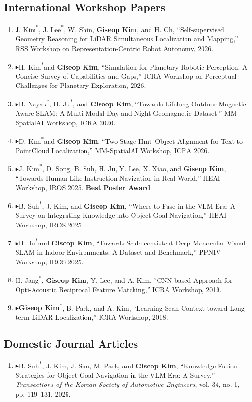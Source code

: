 \documentclass[10pt,a4paper]{article}
\newcommand{\pub}[1]{\item #1}
\newcommand{\leadpub}{\textbf{\ensuremath{\blacktriangleright}}\hspace{0.25em}}
\newcommand{\me}{\textbf{Giseop Kim}}
\newcommand{\corr}{\textsuperscript{\dag}}
\newcommand{\first}{\textsuperscript{*}}
\begin{document}
\subsection{International Workshop Papers}
\begin{enumerate}[resume]
\pub{J. Kim\first, J. Lee\first, W. Shin, \me, and H. Oh\corr, ``Self-supervised Geometry Reasoning for LiDAR Simultaneous Localization and Mapping,'' RSS Workshop on Representation-Centric Robot Autonomy, 2026.}
\pub{\leadpub H. Kim\first and \me\corr, ``Simulation for Planetary Robotic Perception: A Concise Survey of Capabilities and Gaps,'' ICRA Workshop on Perceptual Challenges for Planetary Exploration, 2026.}
\pub{\leadpub B. Nayak\first, H. Ju\first, and \me\corr, ``Towards Lifelong Outdoor Magnetic-Aware SLAM: A Multi-Modal Day-and-Night Geomagnetic Dataset,'' MM-SpatialAI Workshop, ICRA 2026.}
\pub{\leadpub D. Kim\first and \me\corr, ``Two-Stage Hint--Object Alignment for Text-to-PointCloud Localization,'' MM-SpatialAI Workshop, ICRA 2026.}
\pub{\leadpub J. Kim\first, D. Song, B. Suh, H. Ju, Y. Lee, X. Xiao, and \me\corr, ``Towards Human-Like Instruction Navigation in Real-World,'' HEAI Workshop, IROS 2025. \textbf{Best Poster Award}.}
\pub{\leadpub B. Suh\first, J. Kim, and \me\corr, ``Where to Fuse in the VLM Era: A Survey on Integrating Knowledge into Object Goal Navigation,'' HEAI Workshop, IROS 2025.}
\pub{\leadpub H. Ju\first and \me\corr, ``Towards Scale-consistent Deep Monocular Visual SLAM in Indoor Environments: A Dataset and Benchmark,'' PPNIV Workshop, IROS 2025.}
\pub{H. Jang\first, \me, Y. Lee, and A. Kim\corr, ``CNN-based Approach for Opti-Acoustic Reciprocal Feature Matching,'' ICRA Workshop, 2019.}
\pub{\leadpub \me\first, B. Park, and A. Kim\corr, ``Learning Scan Context toward Long-term LiDAR Localization,'' ICRA Workshop, 2018.}
\end{enumerate}

\subsection{Domestic Journal Articles}
\begin{enumerate}[resume]
\pub{\leadpub B. Suh\first, J. Kim, J. Son, M. Park, and \me\corr, ``Knowledge Fusion Strategies for Object Goal Navigation in the VLM Era: A Survey,'' \textit{Transactions of the Korean Society of Automotive Engineers}, vol. 34, no. 1, pp. 119--131, 2026.}
\end{enumerate}
\end{document}
